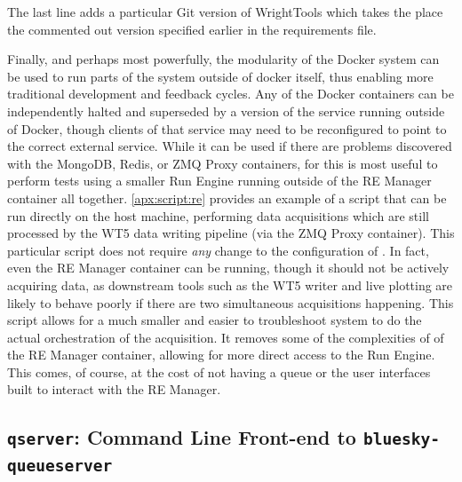 The last line adds a particular Git version of WrightTools which takes the place the commented out version specified earlier in the requirements file.

Finally, and perhaps most powerfully, the modularity of the Docker system can be used to run parts of the system outside of docker itself, thus enabling more traditional development and feedback cycles.
Any of the Docker containers can be independently halted and superseded by a version of the service running outside of Docker, though clients of that service may need to be reconfigured to point to the correct external service.
While it can be used if there are problems discovered with the MongoDB, Redis, or ZMQ Proxy containers, for \biab this is most useful to perform tests using a smaller Run Engine running outside of the RE Manager container all together.
\ref{apx:script:re} provides an example of a script that can be run directly on the host machine, performing data acquisitions which are still processed by the WT5 data writing pipeline (via the ZMQ Proxy container).
This particular script does not require \textit{any} change to the configuration of \biab.
In fact, even the RE Manager container can be running, though it should not be actively acquiring data, as downstream tools such as the WT5 writer and live plotting are likely to behave poorly if there are two simultaneous acquisitions happening.
This script allows for a much smaller and easier to troubleshoot system to do the actual orchestration of the acquisition.
It removes some of the complexities of of the RE Manager container, allowing for more direct access to the Run Engine.
This comes, of course, at the cost of not having a queue or the user interfaces built to interact with the RE Manager.







\subsection{\texttt{qserver}: Command Line Front-end to \texttt{bluesky-queueserver}}

